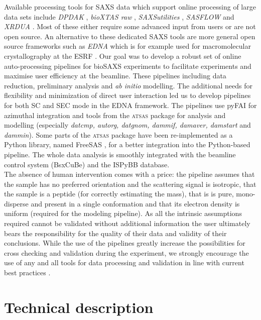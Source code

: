 \documentclass[preprint,pdf]{iucr}              %
\begin{document}
Available processing tools for SAXS data which support online processing of
large data sets include \textit{DPDAK} \cite{DPDAK}, \textit{bioXTAS raw}
\cite{BioXTASraw}, \textit{SAXSutilities} \cite{SAXSUtilities},
\textit{SASFLOW} \cite{X33P,P12} and \textit{XRDUA} \cite{xrdua}. 
Most of these either require some advanced input from users or are not open source.
An alternative to these dedicated SAXS tools are more general open source frameworks such as
\textit{EDNA} which is for example used for macromolecular crystallography at
the ESRF \cite{EDNA}.
Our goal was to develop a robust set of online auto-processing pipelines for bioSAXS experiments to facilitate experiments and maximise user efficiency at the beamline. These pipelines including data reduction, preliminary analysis and \textit{ab initio} modelling.
The additional needs for flexibility and minimization of direct user interaction led us to develop pipelines for both SC and SEC mode in the EDNA framework.
The pipelines use pyFAI for azimuthal integration \cite{pyFAI} and
tools from the \textsc{atsas} package \cite{ATSAS1,ATSAS2} for analysis and modelling
(especially \textit{datcmp, autorg, datgnom, dammif, damaver, damstart} and
\textit{dammin}).
Some parts of the \textsc{atsas} package have been re-implemented as a Python
library, named FreeSAS \cite{freesas}, for a better integration into the
Python-based pipeline.
The whole data analysis is smoothly integrated with the beamline control system
(BsxCuBe) and the ISPyBB \cite{ISPYBB} database.\\

The absence of human intervention comes with a price:  the pipeline assumes that the sample has no preferred orientation and the scattering signal is isotropic,  that the sample is a peptide (for correctly estimating the mass), that is is pure, mono-disperse and present in a single conformation and that its  electron density is uniform (required for the modeling pipeline). 
As all the intrinsic assumptions required cannot be validated without additional information the user ultimately bears the responsibility for the quality of their data and validity of their conclusions. 
While the use of the pipelines greatly increase the possibilities for cross checking and validation during the experiment,  we strongly encourage the use of any and all tools for data processing and validation in line with current best practices \cite{jacques}. 

\section{Technical description}
\end{document}
